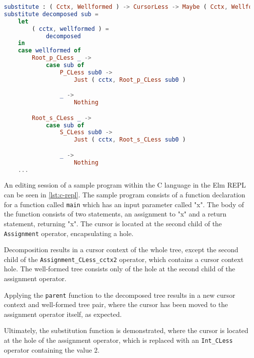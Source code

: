 \begin{minipage}{\textwidth}
    \begin{lstlisting}[style=inline, language=elm, caption={Generated functions for cursor substitution for the C language}, label={lst:c-sub}]
substitute : ( Cctx, Wellformed ) -> CursorLess -> Maybe ( Cctx, Wellformed )
substitute decomposed sub =
    let
        ( cctx, wellformed ) =
            decomposed
    in
    case wellformed of
        Root_p_CLess _ ->
            case sub of
                P_CLess sub0 ->
                    Just ( cctx, Root_p_CLess sub0 )

                _ ->
                    Nothing

        Root_s_CLess _ ->
            case sub of
                S_CLess sub0 ->
                    Just ( cctx, Root_s_CLess sub0 )

                _ ->
                    Nothing
    ...
\end{lstlisting}
\end{minipage}

An editing session of a sample program within the C language in the Elm
REPL can be seen in \cref{lst:c-repl}. The sample program consists of a function
declaration for a function called \texttt{main} which has an input
parameter called "x". The body of the function consists of two statements,
an assignment to "x" and a return statement, returning "x".
The cursor is located at the second child of the \texttt{Assignment} operator, encapsulating a hole.

Decomposition results in a cursor context of the whole tree, except
the second child of the \texttt{Assignment\_CLess\_cctx2} operator, which
contains a cursor context hole. The well-formed tree consists only
of the hole at the second child of the assignment operator.

Applying the \texttt{parent} function to the decomposed tree results in a
new cursor context and well-formed tree pair, where the cursor has been moved
to the assignment operator itself, as expected.

Ultimately, the substitution function is demonstrated, where the cursor is
located at the hole of the assignment operator, which is replaced with
an \texttt{Int\_CLess} operator containing the value 2.

